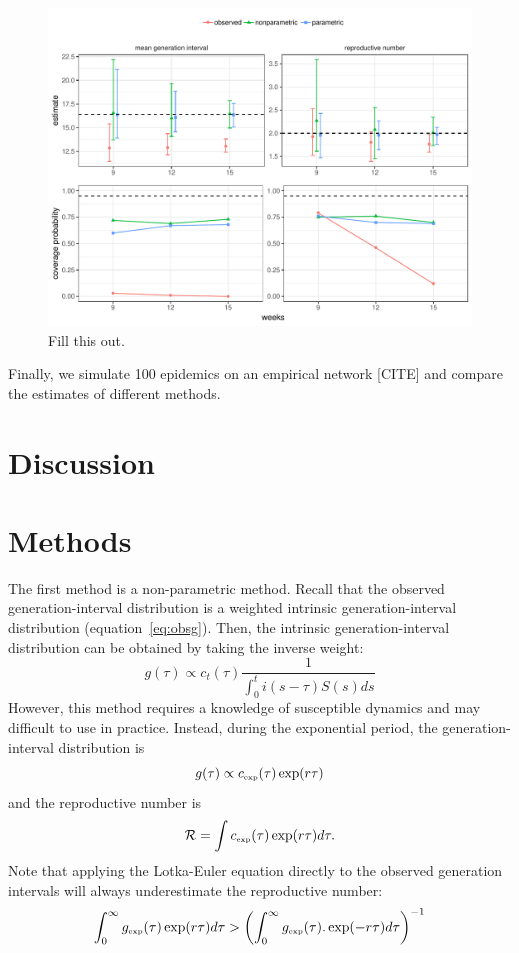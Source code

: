 \documentclass[12pt]{article}
\newcommand{\RR}{\ensuremath{{\mathcal R}}}
\newcommand{\tsub}[2]{#1_{{\textrm{\tiny #2}}}}
\begin{document}
\begin{figure}
\includegraphics[width=\textwidth]{../fig/compare_methods.pdf}
\caption{Fill this out.}
\label{fig:test}
\end{figure}

Finally, we simulate 100 epidemics on an empirical network [CITE] and compare the estimates of different methods.





\clearpage

\section{Discussion}

\section{Methods}

The first method is a non-parametric method.
Recall that the observed generation-interval distribution is a weighted intrinsic generation-interval distribution (equation~\ref{eq:obsg}). 
Then, the intrinsic generation-interval distribution can be obtained by taking the inverse weight:
\begin{equation}
g(\tau) \propto c_t(\tau) \frac{1}{\int_{0}^t i(s-\tau) S(s) ds}
\end{equation}
However, this method requires a knowledge of susceptible dynamics and may difficult to use in practice.
Instead, during the exponential period, the generation-interval distribution is
\begin{equation}
g(\tau) \propto \tsub{c}{exp}(\tau) \exp(r\tau)
\end{equation}
and the reproductive number is
\begin{equation}
\RR = \int \tsub{c}{exp}(\tau) \exp(r\tau) d\tau.
\end{equation}
Note that applying the Lotka-Euler equation directly to the observed generation intervals will always underestimate the reproductive number:
\begin{equation}
\int_0^\infty \tsub{g}{exp}(\tau) \exp(r\tau) d\tau > \left(\int_0^\infty \tsub{g}{exp}(\tau). \exp(-r\tau) d\tau\right)^{-1}
\end{equation}
\end{document}
